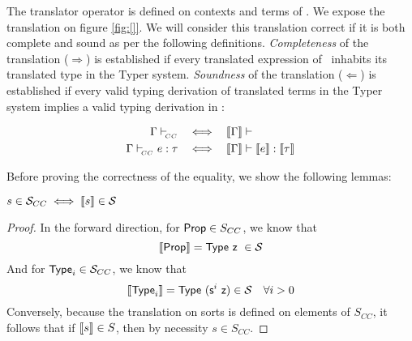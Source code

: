 \documentclass[10pt]{article}
\begin{document}
The translator operator \rew{\_} is defined on contexts and terms of \CC. We expose the translation on figure \ref{fig:[]}. We will consider this translation correct if it is both complete and sound as per the following definitions. \emph{Completeness} of the translation ($\Rightarrow$) is established if every translated expression of \CC\ inhabits its translated type in the Typer system. \emph{Soundness} of the translation ($\Leftarrow$) is established if every valid typing derivation of translated terms in the Typer system implies a valid typing derivation in \CC:
\begin{theorem}
  \label{thm:correctness-translation}
  \begin{align*}
    \Gamma \vdash_{\hspace{-2pt}_{CC}} & ~~ \iff ~~ \llbracket \Gamma \rrbracket \vdash \\
    \Gamma \vdash_{\hspace{-2pt}_{CC}} e:\tau & ~~ \iff ~~ \llbracket \Gamma \rrbracket \vdash \llbracket e \rrbracket:\llbracket \tau \rrbracket
  \end{align*}
\end{theorem}

Before proving the correctness of the equality, we show the following lemmas:
\begin{lemma}
  \label{lem:S-equiv}
  $s \in \mathcal{S}_{CC} \iff \llbracket s \rrbracket \in \mathcal{S}$
  \begin{proof}
    In the forward direction, for $\textsf{Prop} \in S_{CC}$, we know that $$\llbracket \textsf{Prop} \rrbracket = \textsf{Type}\ \textsf{z}\ \in \mathcal{S}$$
    And for $\textsf{Type}_i \in \mathcal{S}_{CC}$, we know that $$\llbracket \textsf{Type}_i \rrbracket = \textsf{Type}\ (\textsf{s}^i\ \textsf{z}) \in \mathcal{S} \quad \forall i > 0$$
    Conversely, because the translation on sorts is defined on elements of $S_{CC}$, it follows that if $\llbracket s \rrbracket \in S$, then by necessity $s \in S_{CC}$.
  \end{proof}
\end{lemma}

\end{document}
